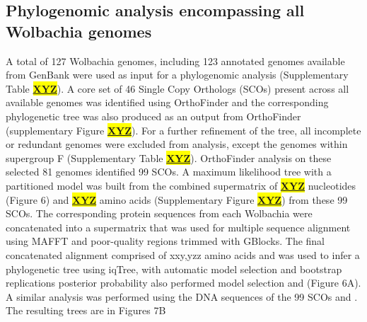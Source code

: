 \documentclass[10pt, a4paper, twocolumn]{article} %
\begin{document}
\subsection{Phylogenomic analysis encompassing all Wolbachia genomes }
A total of 127 Wolbachia genomes, including 123 annotated genomes available from GenBank were used as input for a phylogenomic analysis (Supplementary Table \underline{\textbf{\colorbox{Yellow}{XYZ}}}). A core set of 46 Single Copy Orthologs (SCOs) present across all available genomes was identified using OrthoFinder and the corresponding phylogenetic tree was also produced as an output from OrthoFinder (supplementary Figure \underline{\textbf{\colorbox{Yellow}{XYZ}}}). For a further refinement of the tree, all incomplete or redundant genomes were excluded from analysis, except the genomes within supergroup F (Supplementary Table \underline{\textbf{\colorbox{Yellow}{XYZ}}}). OrthoFinder analysis on these selected 81 genomes identified 99 SCOs. A maximum likelihood tree with a partitioned model was built from the combined supermatrix of \underline{\textbf{\colorbox{Yellow}{XYZ}}} nucleotides (Figure 6) and \underline{\textbf{\colorbox{Yellow}{XYZ}}} amino acids (Supplementary Figure \underline{\textbf{\colorbox{Yellow}{XYZ}}}) from these 99 SCOs. 
The corresponding protein sequences from each Wolbachia were concatenated into a supermatrix that was used for multiple sequence alignment using MAFFT and poor-quality regions trimmed with GBlocks. The final concatenated alignment comprised of xxy,yzz amino acids and was used to infer a phylogenetic tree using iqTree, with automatic model selection and bootstrap replications posterior probability  also performed model selection and (Figure 6A). A similar analysis was performed using the DNA sequences of the 99 SCOs and . The resulting trees are in Figures 7B 
\end{document}
